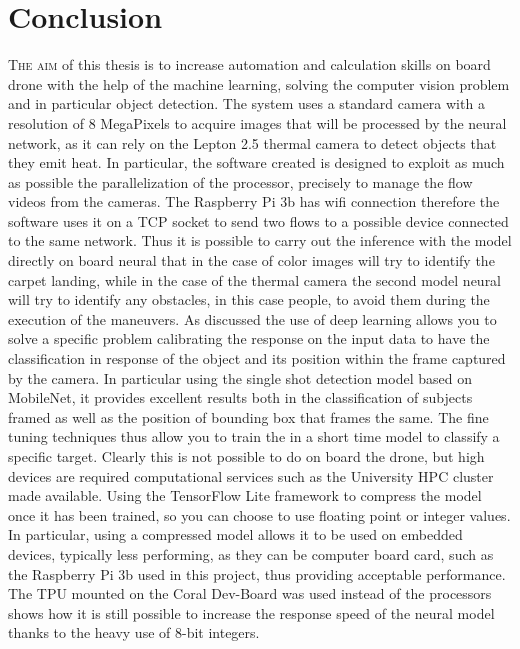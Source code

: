 \chapter{Conclusion}
\label{chap:conclusion}
%
\lettrine[lines=3]{T}{he aim} of this thesis is to increase automation and 
calculation skills on board drone with the help of the machine learning, 
solving the computer vision problem and in particular object detection. 
The system uses a standard camera with a resolution of 8 MegaPixels to acquire 
images that will be processed by the neural network, as it can rely on the
Lepton 2.5 thermal camera to detect objects that they emit heat. 
In particular, the software created is designed to exploit as much as possible
the parallelization of the processor, precisely to manage the flow videos from
the cameras. The Raspberry Pi 3b has wifi connection therefore the software uses
it on a TCP socket to send two flows to a possible device connected to the same
network. 
Thus it is possible to carry out the inference with the model directly on board
neural that in the case of color images will try to identify the carpet landing,
while in the case of the thermal camera the second model neural will try to
identify any obstacles, in this case people, to avoid them during the execution
of the maneuvers. 
As discussed the use of deep learning allows you to solve a specific problem
calibrating the response on the input data to have the classification in
response of the object and its position within the frame captured by the camera.
In particular using the single shot detection model based on MobileNet, it
provides excellent results both in the classification of subjects framed as well
as the position of bounding box that frames the same. 
The fine tuning techniques thus allow you to train the in a short time model to
classify a specific target. Clearly this is not possible to do on board the
drone, but high devices are required computational services such as the
University HPC cluster made available. Using the TensorFlow Lite framework to
compress the model once it has been trained, so you can choose to use floating
point or integer values. 
In particular, using a compressed model allows it to be used on embedded
devices, typically less performing, as they can be computer board card, such as
the Raspberry Pi 3b used in this project, thus providing acceptable performance.
The TPU mounted on the Coral Dev-Board  was used instead of the processors shows
how it is still possible to increase the response speed of the neural model
thanks to the heavy use of 8-bit integers. 
